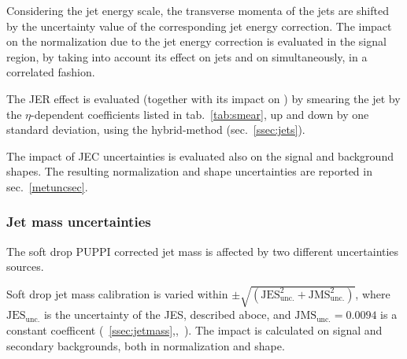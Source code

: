 \noindent Considering the jet energy scale, the transverse momenta of the jets are shifted by the uncertainty value of the corresponding jet energy correction. The impact on the normalization due to the jet energy correction is evaluated in the signal region, by taking into account its effect on jets and on \MET simultaneously, in a correlated fashion.

\noindent The JER effect is evaluated (together with its impact on \MET) by smearing the jet \pt by the $\eta$-dependent coefficients listed in tab.~\ref{tab:smear}, up and down by one standard deviation, using the hybrid-method (sec.~\ref{ssec:jets}).%

\noindent The impact of JEC uncertainties is evaluated also on the signal and background shapes. The resulting normalization and shape uncertainties are reported in sec.~\ref{metuncsec}.%




\subsubsection{Jet mass uncertainties}
\noindent The soft drop PUPPI corrected jet mass is affected by two different uncertainties sources.

\noindent Soft drop jet mass calibration is varied within $\pm \sqrt{ \left( \text{JES}_\text{unc.}^2 + \text{JMS}_\text{unc.}^2 \right) }$, where $\text{JES}_\text{unc.}$ is the uncertainty of the JES, described aboce, and $\text{JMS}_\text{unc.}=0.0094$ is a constant coefficent (~\ref{ssec:jetmass},\cite{bib:1748-0221-6-11-P11002},~\cite{CMS-DP-2016-020}). The impact is calculated on signal and secondary backgrounds, both in normalization and shape.

